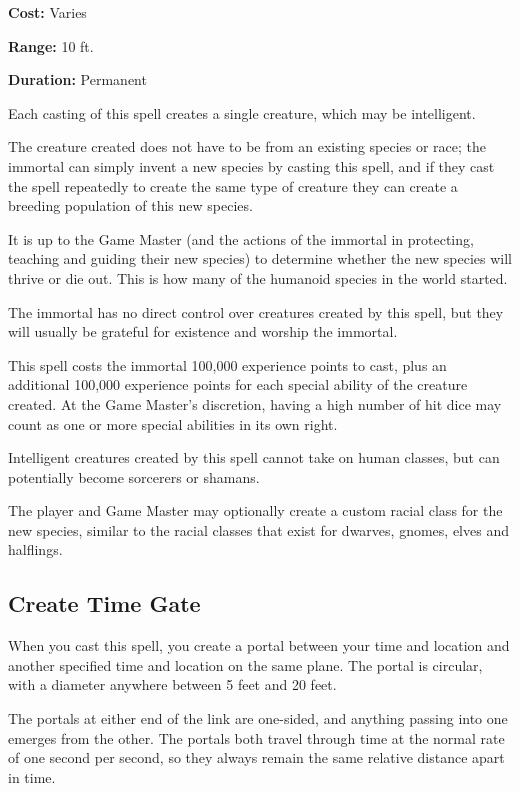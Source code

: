 \begin{multicols*}{2}
{\textbf{Cost:} Varies

\textbf{Range:} 10 ft.

\textbf{Duration:} Permanent}

Each casting of this spell creates a single creature, which may be intelligent.

The creature created does not have to be from an existing species or race; the immortal can simply invent a new species by casting this spell, and if they cast the spell repeatedly to create the same type of creature they can create a breeding population of this new species.

It is up to the Game Master (and the actions of the immortal in protecting, teaching and guiding their new species) to determine whether the new species will thrive or die out. This is how many of the humanoid species in the world started.

The immortal has no direct control over creatures created by this spell, but they will usually be grateful for existence and worship the immortal.

This spell costs the immortal 100,000 experience points to cast, plus an additional 100,000 experience points for each special ability of the creature created. At the Game Master’s discretion, having a high number of hit dice may count as one or more special abilities in its own right.

Intelligent creatures created by this spell cannot take on human classes, but can potentially become sorcerers or shamans.

The player and Game Master may optionally create a custom racial class for the new species, similar to the racial classes that exist for dwarves, gnomes, elves and halflings.

\subsection{Create Time Gate}

When you cast this spell, you create a portal between your time and location and another specified time and location on the same plane. The portal is circular, with a diameter anywhere between 5 feet and 20 feet.

The portals at either end of the link are one-sided, and anything passing into one emerges from the other. The portals both travel through time at the normal rate of one second per second, so they always remain the same relative distance apart in time. 


\end{multicols*}
